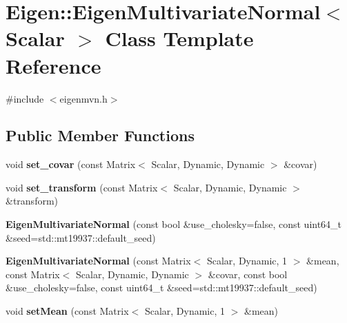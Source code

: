 \hypertarget{classEigen_1_1EigenMultivariateNormal}{\section{Eigen\-:\-:Eigen\-Multivariate\-Normal$<$ Scalar $>$ Class Template Reference}
\label{classEigen_1_1EigenMultivariateNormal}
}


{\ttfamily \#include $<$eigenmvn.\-h$>$}

\subsection*{Public Member Functions}
\begin{DoxyCompactItemize}
\item 
\hypertarget{classEigen_1_1EigenMultivariateNormal_a5c226d14c6597ad2314a2730f9b2e402}{void {\bfseries set\-\_\-covar} (const Matrix$<$ Scalar, Dynamic, Dynamic $>$ \&covar)}\label{classEigen_1_1EigenMultivariateNormal_a5c226d14c6597ad2314a2730f9b2e402}

\item 
\hypertarget{classEigen_1_1EigenMultivariateNormal_a05fa9ab49cb21d677c7ed84a276964a7}{void {\bfseries set\-\_\-transform} (const Matrix$<$ Scalar, Dynamic, Dynamic $>$ \&transform)}\label{classEigen_1_1EigenMultivariateNormal_a05fa9ab49cb21d677c7ed84a276964a7}

\item 
\hypertarget{classEigen_1_1EigenMultivariateNormal_ad8dc1c371b98d343741f144a3babef91}{{\bfseries Eigen\-Multivariate\-Normal} (const bool \&use\-\_\-cholesky=false, const uint64\-\_\-t \&seed=std\-::mt19937\-::default\-\_\-seed)}\label{classEigen_1_1EigenMultivariateNormal_ad8dc1c371b98d343741f144a3babef91}

\item 
\hypertarget{classEigen_1_1EigenMultivariateNormal_a427929ac9e14e93d56ec6acdb85a8dbb}{{\bfseries Eigen\-Multivariate\-Normal} (const Matrix$<$ Scalar, Dynamic, 1 $>$ \&mean, const Matrix$<$ Scalar, Dynamic, Dynamic $>$ \&covar, const bool \&use\-\_\-cholesky=false, const uint64\-\_\-t \&seed=std\-::mt19937\-::default\-\_\-seed)}\label{classEigen_1_1EigenMultivariateNormal_a427929ac9e14e93d56ec6acdb85a8dbb}

\item 
\hypertarget{classEigen_1_1EigenMultivariateNormal_aa9b735112cea507cd0a5f0eeffafe3c2}{void {\bfseries set\-Mean} (const Matrix$<$ Scalar, Dynamic, 1 $>$ \&mean)}\label{classEigen_1_1EigenMultivariateNormal_aa9b735112cea507cd0a5f0eeffafe3c2}


\end{DoxyCompactItemize}
